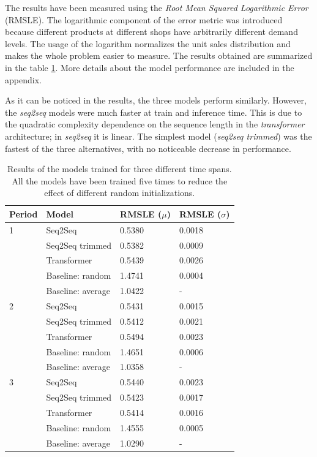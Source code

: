 \documentclass{elsarticle}
\begin{document}
	The results have been measured using the \textit{Root Mean Squared Logarithmic Error} (RMSLE). The logarithmic component of the error metric was introduced because different products at different shops have arbitrarily different demand levels. The usage of the logarithm normalizes the unit sales distribution and makes the whole problem easier to measure. The results obtained are summarized in the table \ref{tab:results}. More details about the model performance are included in the appendix.
	
	As it can be noticed in the results, the three models perform similarly. However, the \textit{seq2seq} models were much faster at train and inference time. This is due to the quadratic complexity dependence on the sequence length in the \textit{transformer} architecture; in \textit{seq2seq} it is linear. The simplest model (\textit{seq2seq trimmed}) was the fastest of the three alternatives, with no noticeable decrease in performance.

	\begin{table}[!h]
		\caption{Results of the models trained for three different time spans. All the models have been trained five times to reduce the effect of different random initializations.}
		\label{tab:results}
		\centering
	\begin{tabular}{llll}
		\hline
		Period & Model & RMSLE ($\mu$) & RMSLE ($\sigma$) \\
		\hline
		1&Seq2Seq & 0.5380 & 0.0018 \\
		
		&Seq2Seq trimmed & 0.5382 & 0.0009 \\
		
		&Transformer & 0.5439 & 0.0026 \\
		
		&Baseline: random & 1.4741 & 0.0004 \\
		
		&Baseline: average & 1.0422 & - \\

		\hline
		2&Seq2Seq & 0.5431 & 0.0015 \\
		
		&Seq2Seq trimmed & 0.5412 & 0.0021 \\
		
		&Transformer & 0.5494 & 0.0023 \\
		
		&Baseline: random & 1.4651 & 0.0006 \\
		
		&Baseline: average & 1.0358 & - \\
		\hline
		3&Seq2Seq & 0.5440 & 0.0023 \\

		&Seq2Seq trimmed & 0.5423 & 0.0017 \\

		&Transformer & 0.5414 & 0.0016 \\

		&Baseline: random & 1.4555 & 0.0005 \\

		&Baseline: average & 1.0290 & - \\
		\hline
	\end{tabular}
    \end{table}
	 
\end{document}
